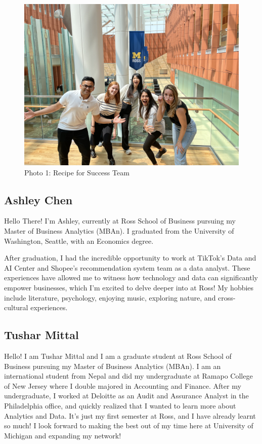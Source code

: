 \documentclass[
]{article}
\begin{document}
\begin{figure}
\centering
\includegraphics{group_photo.jpg}
\caption{Photo 1: Recipe for Success Team}
\end{figure}

\hypertarget{ashley-chen}{%
\subsection{Ashley Chen}\label{ashley-chen}}

Hello There! I'm Ashley, currently at Ross School of Business pursuing my Master of Business Analytics (MBAn). I graduated from the University of Washington, Seattle, with an Economics degree.

After graduation, I had the incredible opportunity to work at TikTok's Data and AI Center and Shopee's recommendation system team as a data analyst. These experiences have allowed me to witness how technology and data can significantly empower businesses, which I'm excited to delve deeper into at Ross! My hobbies include literature, psychology, enjoying music, exploring nature, and cross-cultural experiences.

\hypertarget{tushar-mittal}{%
\subsection{Tushar Mittal}\label{tushar-mittal}}

Hello!
I am Tushar Mittal and I am a graduate student at Ross School of Business pursuing my Master of Business Analytics (MBAn). I am an international student from Nepal and did my undergraduate at Ramapo College of New Jersey where I double majored in Accounting and Finance. After my undergraduate, I worked at Deloitte as an Audit and Assurance Analyst in the Philadelphia office, and quickly realized that I wanted to learn more about Analytics and Data. It's just my first semester at Ross, and I have already learnt so much! I look forward to making the best out of my time here at University of Michigan and expanding my network!
\end{document}
